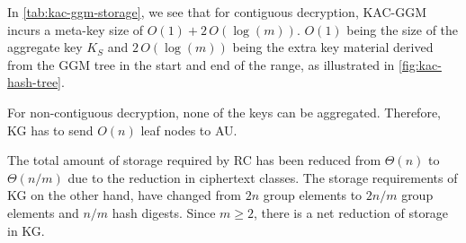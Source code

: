 \documentclass[hyp,a4paper,12pt,openbib]{socreport}
\begin{document}
In \cref{tab:kac-ggm-storage}, we see that for contiguous decryption, KAC-GGM incurs a meta-key size of $O(1) + 2 \, O(\log(m))$. $O(1)$ being the size of the aggregate key $K_S$ and $2 \, O(\log(m))$ being the extra key material derived from the GGM tree in the start and end of the range, as illustrated in \cref{fig:kac-hash-tree}.

For non-contiguous decryption, none of the keys can be aggregated. Therefore, KG has to send $O(n)$ leaf nodes to AU.  

The total amount of storage required by RC has been reduced from $\Theta(n)$ to $\Theta(n/m)$ due to the reduction in ciphertext classes. The storage requirements of KG on the other hand, have changed from $2n$ group elements to $2n/m$ group elements and $n/m$ hash digests. Since $m \geq 2$, there is a net reduction of storage in KG.
\end{document}
